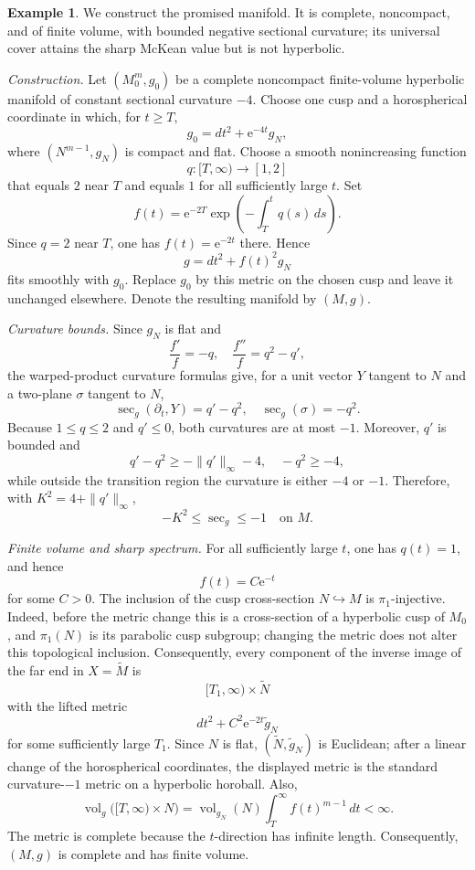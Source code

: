 \documentclass[12pt]{amsart}
\theoremstyle{definition}
\newtheorem{example}[theorem]{Example}
\numberwithin{equation}{section}
\newcommand{\ee}{{\mathrm{e}}}
\newcommand{\vol}{\operatorname{vol}}
\begin{document}
\begin{example}
\label{ex:bounded-curvature-finite-volume}
We construct the promised manifold.  It is complete, noncompact, and of
finite volume, with bounded negative sectional curvature; its universal
cover attains the sharp McKean value but is not hyperbolic.

\smallskip
\noindent\emph{Construction.}
Let \((M_0^m,g_0)\) be a complete noncompact finite-volume hyperbolic
manifold of constant sectional curvature \(-4\).  Choose one cusp and a
horospherical coordinate in which, for \(t\geq T\),
\[
  g_0=dt^2+\ee^{-4t}g_N,
\]
where \((N^{m-1},g_N)\) is compact and flat.  Choose a smooth
nonincreasing function
\[
  q\colon[T,\infty)\longrightarrow[1,2]
\]
that equals \(2\) near \(T\) and equals \(1\) for all sufficiently large
\(t\).  Set
\[
  f(t)
  =\ee^{-2T}
   \exp\left(-\int_T^tq(s)\,ds\right).
\]
Since \(q=2\) near \(T\), one has \(f(t)=\ee^{-2t}\) there.  Hence
\[
  g=dt^2+f(t)^2g_N
\]
fits smoothly with \(g_0\).  Replace \(g_0\) by this metric on the chosen
cusp and leave it unchanged elsewhere.  Denote the resulting manifold by
\((M,g)\).

\smallskip
\noindent\emph{Curvature bounds.}
Since \(g_N\) is flat and
\[
  \frac{f'}{f}=-q,
  \quad
  \frac{f''}{f}=q^2-q',
\]
the warped-product curvature formulas give, for a unit vector \(Y\)
tangent to \(N\) and a two-plane \(\sigma\) tangent to \(N\),
\[
  \sec_g(\partial_t,Y)=q'-q^2,
  \quad
  \sec_g(\sigma)=-q^2.
\]
Because \(1\leq q\leq2\) and \(q'\leq0\), both curvatures are at most
\(-1\).  Moreover, \(q'\) is bounded and
\[
  q'-q^2\geq-\|q'\|_\infty-4,
  \quad
  -q^2\geq-4,
\]
while outside the transition region the curvature is either \(-4\) or
\(-1\).  Therefore, with \(K^2=4+\|q'\|_\infty\),
\[
  -K^2\leq\sec_g\leq-1
  \quad\text{on \(M\)}.
\]

\smallskip
\noindent\emph{Finite volume and sharp spectrum.}
For all sufficiently large \(t\), one has \(q(t)=1\), and hence
\[
  f(t)=C\ee^{-t}
\]
for some \(C>0\).  The inclusion of the cusp cross-section
\(N\hookrightarrow M\) is \(\pi_1\)-injective.  Indeed, before the metric
change this is a cross-section of a hyperbolic cusp of \(M_0\), and
\(\pi_1(N)\) is its parabolic cusp subgroup; changing the metric does not
alter this topological inclusion.  Consequently, every component of the
inverse image of the far end in \(X=\widetilde M\) is
\[
  [T_1,\infty)\times\widetilde N
\]
with the lifted metric
\[
  dt^2+C^2\ee^{-2t}\widetilde g_N
\]
for some sufficiently large \(T_1\).  Since \(N\) is flat,
\((\widetilde N,\widetilde g_N)\) is Euclidean; after a linear change of
the horospherical coordinates, the displayed metric is the standard
curvature-\(-1\) metric on a hyperbolic horoball.  Also,
\[
  \vol_g\bigl([T,\infty)\times N\bigr)
  =\vol_{g_N}(N)\int_T^\infty f(t)^{m-1}\,dt
  <\infty.
\]
The metric is complete because the \(t\)-direction has infinite length.
Consequently, \((M,g)\) is complete and has finite volume.


\end{example}
\end{document}
